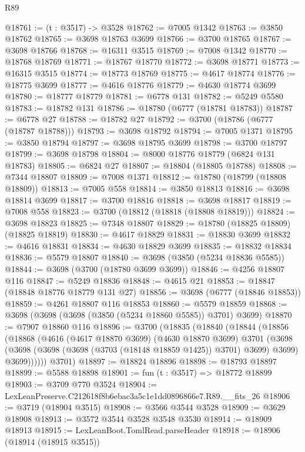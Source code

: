 \begin{lexlean}{R89}
\begin{coremodule}
@18761 := (t : @3517) -> @3528
@18762 := @7005 @1342
@18763 := @3850 @18762
@18765 := @3698 @18763 @3699
@18766 := @3700 @18765
@18767 := @3698 @18766
@18768 := @16311 @3515
@18769 := @7008 @1342
@18770 := @18768 @18769
@18771 := @18767 @18770
@18772 := @3698 @18771
@18773 := @16315 @3515
@18774 := @18773 @18769
@18775 := @4617 @18774
@18776 := @18775 @3699
@18777 := @4616 @18776
@18779 := @4630 @18774 @3699
@18780 := @18777 @18779
@18781 := @6778 @131
@18782 := @5249 @5580
@18783 := @18782 @131
@18786 := @18780 (@6777 (@18781 @18783))
@18787 := @6778 @27
@18788 := @18782 @27
@18792 := @3700 (@18786 (@6777 (@18787 @18788)))
@18793 := @3698 @18792
@18794 := @7005 @1371
@18795 := @3850 @18794
@18797 := @3698 @18795 @3699
@18798 := @3700 @18797
@18799 := @3698 @18798
@18804 := @8000 @18776 @18779 (@6824 @131 @18783)
@18805 := @6824 @27
@18807 := @18804 (@18805 @18788)
@18808 := @7344 @18807
@18809 := @7008 @1371
@18812 := @18780 (@18799 (@18808 @18809))
@18813 := @7005 @558
@18814 := @3850 @18813
@18816 := @3698 @18814 @3699
@18817 := @3700 @18816
@18818 := @3698 @18817
@18819 := @7008 @558
@18823 := @3700 (@18812 (@18818 (@18808 @18819)))
@18824 := @3698 @18823
@18825 := @7348 @18807
@18829 := @18780 (@18825 @18809) (@18825 @18819)
@18830 := @4617 @18829
@18831 := @18830 @3699
@18832 := @4616 @18831
@18834 := @4630 @18829 @3699
@18835 := @18832 @18834
@18836 := @5579 @18807
@18840 := @3698 (@3850 (@5234 @18836 @5585))
@18844 := @3698 (@3700 (@18780 @3699 @3699))
@18846 := @4256 @18807 @116
@18847 := @5249 @18836
@18848 := @4615 @21
@18853 := @18847 (@18848 @18776 @18779 @131 @27)
@18856 := @3698 (@6777 (@18846 @18853))
@18859 := @4261 @18807 @116 @18853
@18860 := @5579 @18859
@18868 := @3698 (@3698 (@3698 (@3850 (@5234 @18860 @5585)) @3701) @3699)
@18870 := @7907 @18860 @116
@18896 := @3700
    (@18835
      (@18840
        (@18844
          (@18856
            (@18868
              (@4616
                (@4617 @18870 @3699)
                (@4630 @18870 @3699)
                @3701
                (@3698
                  (@3698 (@3698 (@3698 (@3703 (@18148 @18859 @1425)) @3701) @3699) @3699)
                  @3699))))))
      @3701)
@18897 := @18824 @18896
@18898 := @18793 @18897
@18899 := @5588 @18898
@18901 := fun (t : @3517) => @18772 @18899
@18903 := @3709 @770 @3524
@18904 := LexLeanPreserve.C212618f8b6ebac3a5c1e1dd0896866e7.R89.__fits_26
@18906 := @3719 (@18904 @3515)
@18908 := @3566 @3544 @3528
@18909 := @3629 @18908
@18913 := @3572 @3544 @3528 @3548 @3530
@18914 := @18909 @18913
@18915 := LexLeanBoot.TomlRead.parseHeader
@18918 := @18906 (@18914 (@18915 @3515))

\end{coremodule}
\end{lexlean}
